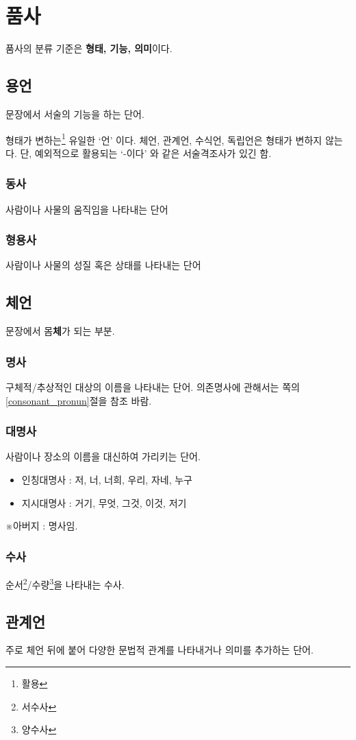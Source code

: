 \documentclass[10pt]{report}
\begin{document}
\section{품사}
품사의 분류 기준은 \textbf{형태, 기능, 의미}이다.
\subsection{용언}
문장에서 서술의 기능을 하는 단어.

형태가 변하는\footnote{활용} 유일한 `언' 이다. 체언, 관계언, 수식언, 독립언은 형태가 변하지 않는다. 단, 예외적으로 활용되는 `-이다' 와 같은 서술격조사가 있긴 함.
\subsubsection{동사}
사람이나 사물의 움직임을 나타내는 단어
\subsubsection{형용사}
사람이나 사물의 성질 혹은 상태를 나타내는 단어
\subsection{체언}
문장에서 몸\textbf{체}가 되는 부분.
\subsubsection{명사}
구체적/추상적인 대상의 이름을 나타내는 단어.
의존명사에 관해서는 \pageref{consonant_pronun}쪽의 \ref{consonant_pronun}절을 참조 바람.
\subsubsection{대명사}
사람이나 장소의 이름을 대신하여 가리키는 단어.
\begin{itemize}
\item 인칭대명사 : 저, 너, 너희, 우리, 자네, 누구
\item 지시대명사 : 거기, 무엇, 그것, 이것, 저기
\end{itemize}
※아버지 : 명사임.
\subsubsection{수사}
순서\footnote{서수사}/수량\footnote{양수사}을 나타내는 수사.
\subsection{관계언}
주로 체언 뒤에 붙어 다양한 문법적 관계를 나타내거나 의미를 추가하는 단어.
\end{document}
